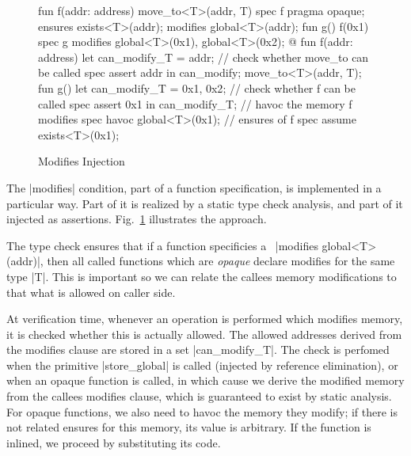 
\begin{figure}[t!]
  \caption{Modifies Injection}
  \label{fig:Modifies}
  \centering
\begin{MoveBox}
  fun f(addr: address) { move_to<T>(addr, T{}) }
  spec f {
    pragma opaque;
    ensures exists<T>(addr);
    modifies global<T>(addr);
  }
  fun g() { f(0x1) }
  spec g {
    modifies global<T>(0x1), global<T>(0x2);
  }
  @\transform@
  fun f(addr: address) {
    let can_modify_T = {addr};
    // check whether move_to can be called
    spec assert addr in can_modify;
    move_to<T>(addr, T{});
  }
  fun g() {
    let can_modify_T = {0x1, 0x2};
    // check whether f can be called
    spec assert 0x1 in can_modify_T;
    // havoc the memory f modifies
    spec havoc global<T>(0x1);
    // ensures of f
    spec assume exists<T>(0x1);
  }
\end{MoveBox}
\end{figure}


The |modifies| condition, part of a function specification, is implemented in a
particular way.  Part of it is realized by a static type check analysis, and
part of it injected as assertions. Fig.~\ref{fig:Modifies} illustrates the
approach.

The type check ensures that if a function specificies a~%
|modifies global<T>(addr)|, then all called functions which are \emph{opaque}
declare modifies for the same type |T|. This is important so we can relate the
callees memory modifications to that what is allowed on caller side.

At verification time, whenever an operation is performed which modifies memory,
it is checked whether this is actually allowed. The allowed addresses derived
from the modifies clause are stored in a set |can_modify_T|. The check is
perfomed when the primitive |store_global| is called (injected by reference
elimination), or when an opaque function is called, in which cause we derive the
modified memory from the callees modifies clause, which is guaranteed to exist
by static analysis. For opaque functions, we also need to havoc the memory they
modify; if there is not related ensures for this memory, its value is
arbitrary. If the function is inlined, we proceed by substituting its code.



\label{sec:GlobalInvariants}




